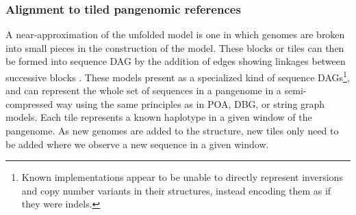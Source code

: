 

\subsubsection{Alignment to tiled pangenomic references}

A near-approximation of the unfolded model is one in which genomes are broken into small pieces in the construction of the model.
These blocks or tiles can then be formed into sequence DAG by the addition of edges showing linkages between successive blocks \cite{guthrie2015tiling}.
These models present as a specialized kind of sequence DAGs\footnote{Known implementations appear to be unable to directly represent inversions and copy number variants in their structures, instead encoding them as if they were indels.}, and can represent the whole set of sequences in a pangenome in a semi-compressed way using the same principles as in POA, DBG, or string graph models.
Each tile represents a known haplotype in a given window of the pangenome.
As new genomes are added to the structure, new tiles only need to be added where we observe a new sequence in a given window.


